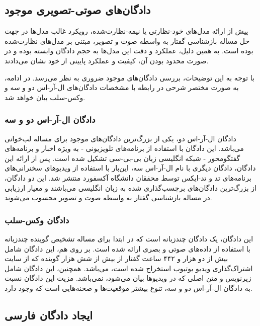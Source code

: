  \subsection{دادگان‌های صوتی-تصویری موجود}
 
 پیش از ارائه مدل‌های خود-نظارتی یا نیمه-نظارت‌شده، رویکرد غالب مدل‌ها در جهت حل مساله بازشناسی گفتار به واسطه صوت و تصویر، مبتنی بر مدل‌های نظارت‌شده بوده است. به همین دلیل، عملکرد و دقت این مدل‌ها به حجم دادگان وابسته بوده و در صورت محدود بودن آن، کیفیت و عملکرد پایینی از خود نشان می‌دادند.
 
 با توجه به این توضیحات، بررسی دادگان‌های موجود ضروری به نظر می‌رسد. در ادامه، به صورت مختصر شرحی در رابطه با مشخصات دادگان‌های ال-آر-اس دو و سه
و وکس-سلب
بیان خواهد شد.
   
\subsubsection{دادگان ال-آر-اس دو و سه}

دادگان ال-آر-اس دو، یکی از بزرگ‌ترین دادگان‌های موجود برای مساله لب‌خوانی می‌باشد. این دادگان با استفاده از برنامه‌های تلویزیونی - به ویژه اخبار و برنامه‌های گفتگومحور
- شبکه انگلیسی زبان بی-بی-سی
تشکیل شده است. پس از ارائه این دادگان، دادگان دیگری با نام ال-آر-اس سه، این‌بار با استفاده از ویدیو‌های سخنرانی‌های برنامه‌های تد
و تد-ایکس
توسط محققان دانشگاه آکسفورد
منتشر شد. این دو دادگان، از بزرگ‌ترین دادگان‌های برچسب‌گذاری شده به زبان انگلیسی می‌باشند و معیار ارزیابی
در مساله بازشناسی گفتار به واسطه صوت و تصویر محسوب می‌شوند.

\subsubsection{دادگان وکس-سلب}

 این دادگان، یک دادگان چند‌زبانه است که در ابتدا برای مساله تشخیص گوینده چندزبانه با استفاده از داده‌های صوتی و بصری ارائه شده است. بر روی هم، این دادگان شامل بیش از دو هزار و ۴۴۲ ساعت گفتار از بیش از شش هزار گوینده که از سایت اشتراک‌گذاری ویدیو یوتیوب
استخراج شده است، می‌باشد. همچنین، این دادگان شامل زیرنویس و متن اصلی که در ویدیو‌ها بیان می‌شود، نمی‌باشد. مزیت این دادگان نسبت به دادگان ال-آر-اس دو و سه، تنوع بیشتر موقعیت‌ها و صحنه‌هایی است که وجود دارد. 
 
\subsection{ایجاد دادگان فارسی}

